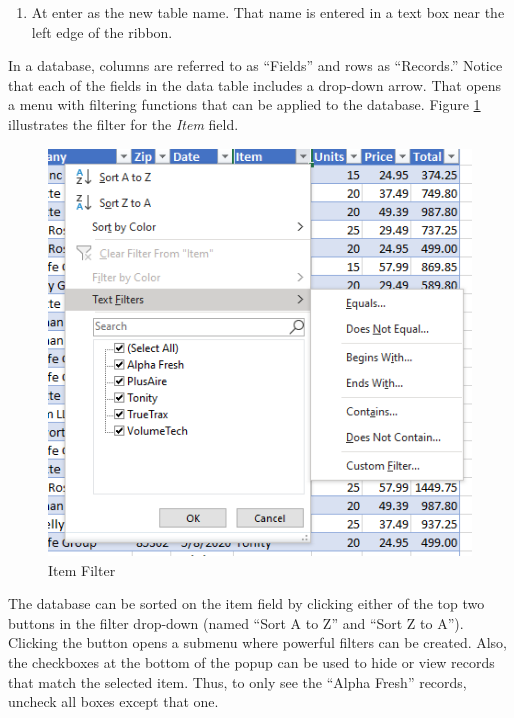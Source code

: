 \begin{enumerate}[resume]
	\item At  enter  as the new table name. That name is entered in a text box near the left edge of the ribbon.
\end{enumerate}

In a database, columns are referred to as ``Fields'' and rows as ``Records.'' Notice that each of the fields in the data table includes a drop-down arrow. That opens a menu with filtering functions that can be applied to the database. Figure \ref{09:fig12} illustrates the filter for the \textit{Item} field.

\begin{figure}[H]
	\centering
	\includegraphics[width=\maxwidth{.95\linewidth}]{gfx/ch09_fig12}
	\caption{Item Filter}
	\label{09:fig12}
\end{figure}

The database can be sorted on the item field by clicking either of the top two buttons in the filter drop-down (named ``Sort A to Z'' and ``Sort Z to A''). Clicking the  button opens a submenu where powerful filters can be created. Also, the checkboxes at the bottom of the popup can be used to hide or view records that match the selected item. Thus, to only see the ``Alpha Fresh'' records, uncheck all boxes except that one.


